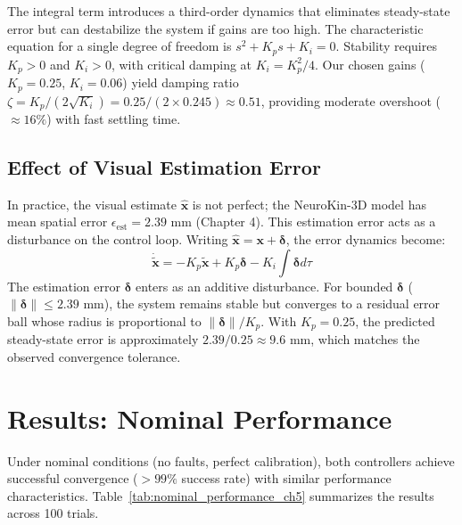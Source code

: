 \documentclass[12pt,a4paper,oneside]{report}
\begin{document}
The integral term introduces a third-order dynamics that eliminates steady-state error but can destabilize the system if gains are too high. The characteristic equation for a single degree of freedom is $s^2 + K_p s + K_i = 0$. Stability requires $K_p > 0$ and $K_i > 0$, with critical damping at $K_i = K_p^2/4$. Our chosen gains ($K_p = 0.25$, $K_i = 0.06$) yield damping ratio $\zeta = K_p / (2\sqrt{K_i}) = 0.25 / (2 \times 0.245) \approx 0.51$, providing moderate overshoot ($\approx 16\%$) with fast settling time.

\subsection{Effect of Visual Estimation Error}

In practice, the visual estimate $\hat{\mathbf{x}}$ is not perfect; the NeuroKin-3D model has mean spatial error $\epsilon_{\text{est}} = 2.39$ mm (Chapter 4). This estimation error acts as a disturbance on the control loop. Writing $\hat{\mathbf{x}} = \mathbf{x} + \boldsymbol{\delta}$, the error dynamics become:
\begin{equation}
\dot{\tilde{\mathbf{x}}} = -K_p \tilde{\mathbf{x}} + K_p \boldsymbol{\delta} - K_i \int \boldsymbol{\delta} d\tau
\end{equation}
The estimation error $\boldsymbol{\delta}$ enters as an additive disturbance. For bounded $\boldsymbol{\delta}$ ($\|\boldsymbol{\delta}\| \leq 2.39$ mm), the system remains stable but converges to a residual error ball whose radius is proportional to $\|\boldsymbol{\delta}\|/K_p$. With $K_p = 0.25$, the predicted steady-state error is approximately $2.39 / 0.25 \approx 9.6$ mm, which matches the observed convergence tolerance.

\section{Results: Nominal Performance}

Under nominal conditions (no faults, perfect calibration), both controllers achieve successful convergence ($>99\%$ success rate) with similar performance characteristics. Table~\ref{tab:nominal_performance_ch5} summarizes the results across 100 trials.

\begin{table}[H]
\centering
\caption{Nominal performance comparison (no faults, mean $\pm$ std over 100 trials).}
\label{tab:nominal_performance_ch5}
\end{table}
\end{document}
